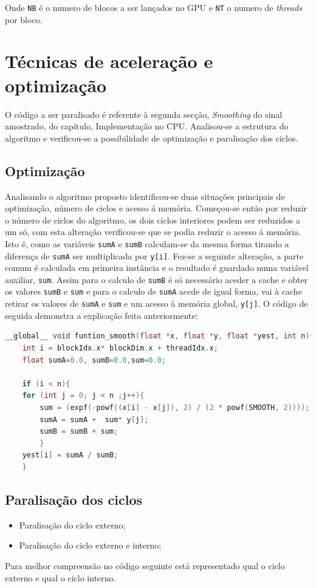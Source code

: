 \documentclass[11pt]{article}
\numberwithin{equation}{section}
\begin{document}
Onde \texttt{NB} é o numero de blocos a ser lançados no GPU e \texttt{NT} o numero de \textit{threads} por bloco.
	
\section{Técnicas de aceleração e optimização}
O código a ser paralisado é referente à segunda secção, \textit{Smoothing}  do sinal amostrado, do capítulo, Implementação no CPU.
Analisou-se a estrutura do algoritmo e verificou-se a possibilidade de optimização e paralisação dos ciclos. 

\subsection{Optimização}
Analisando o algoritmo proposto identificou-se duas situações principais de optimização, número de ciclos e acesso á memória.
Começou-se então por reduzir o número de ciclos do algoritmo, os dois ciclos interiores podem ser reduzidos a um só, com esta alteração verificou-se que se podia reduzir o acesso á memória. Isto é, como as variáveis \texttt{sumA} e \texttt{sumB} calculam-se da mesma forma tirando a diferença de \texttt{sumA}  ser multiplicada por \texttt{y[i]}. Fez-se a seguinte alteração, a parte comum é calculada em primeira instância e o resultado é guardado numa variável auxiliar, \texttt{sum}. Assim para o calculo de \texttt{sumB} é só necessário aceder a cache e obter os valores \texttt{sumB} e \texttt{sum} e para o calculo de \texttt{sumA} acede de igual forma, vai à cache retirar os valores de \texttt{sumA} e \texttt{sum} e um acesso à memória global, \texttt{y[j]}. O código de seguida demonstra a explicação feita anteriormente:
\begin{lstlisting}[language=C]
__global__ void funtion_smooth(float *x, float *y, float *yest, int n){
	int i = blockIdx.x* blockDim.x + threadIdx.x;
	float sumA=0.0, sumB=0.0,sum=0.0;

	if (i < n){
	for (int j = 0; j < n ;j++){
		sum = (expf(-powf((x[i] - x[j]), 2) / (2 * powf(SMOOTH, 2))));
		sumA = sumA +  sum* y[j];
		sumB = sumB + sum;
		}
	yest[i] = sumA / sumB;
	}
\end{lstlisting}

\subsection{Paralisação dos ciclos}
\begin{itemize}
	\vspace{-3mm}
	\item Paralisação do ciclo externo;
	\vspace{-1.5mm}
	\item Paralisação do ciclo externo e interno;
\end{itemize}
Para melhor compreensão no código seguinte está representado qual o ciclo externo e qual o ciclo interno.
\end{document}
